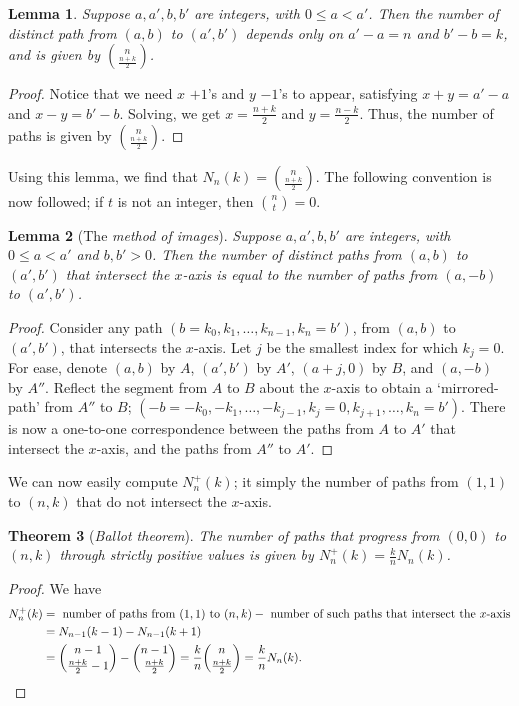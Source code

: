 \documentclass[15pt,a4paper]{book}
\newtheorem{theorem}{Theorem}[chapter]
\newtheorem{lemma}[theorem]{Lemma}
\theoremstyle{definition}
\newcommand{\eax}[1]{\emph{#1}\index{#1}} %
\begin{document}
\begin{lemma}
    Suppose $a,a',b,b'$ are integers, with $0 \leq a < a'$. Then the number of distinct path from $(a,b)$ to $(a',b')$ depends only on $a'-a = n$ and $b'-b = k$, and is given by $\binom{n}{\frac{n+k}{2}}$.
\end{lemma}
\begin{proof}
    Notice that we need $x$ $+1$'s and $y$ $-1$'s to appear, satisfying $x+y = a'-a$ and $x-y = b'-b$. Solving, we get $x = \frac{n+k}{2}$ and $y = \frac{n-k}{2}$. Thus, the number of paths is given by $\binom{n}{\frac{n+k}{2}}$.
\end{proof}
Using this lemma, we find that $N_{n}(k) = \binom{n}{\frac{n+k}{2}}$. The following convention is now followed; if $t$ is not an integer, then $\binom{n}{t} = 0$.

\begin{lemma}[The \eax{method of images}]
    Suppose $a,a',b,b'$ are integers, with $0 \leq a < a'$ and $b,b'>0$. Then the number of distinct paths from $(a,b)$ to $(a',b')$ that intersect the $x$-axis is equal to the number of paths from $(a,-b)$ to $(a',b')$.
\end{lemma}
\begin{proof}
    Consider any path $(b=k_{0},k_{1},\ldots,k_{n-1},k_{n}=b')$, from $(a,b)$ to $(a',b')$, that intersects the $x$-axis. Let $j$ be the smallest index for which $k_{j}=0$. For ease, denote $(a,b)$ by $A$, $(a',b')$ by $A'$, $(a+j,0)$ by $B$, and $(a,-b)$ by $A''$. Reflect the segment from $A$ to $B$ about the $x$-axis to obtain a `mirrored-path' from $A''$ to $B$; $(-b=-k_{0},-k_{1},\ldots,-k_{j-1},k_{j}=0,k_{j+1},\ldots,k_{n}=b')$. There is now a one-to-one correspondence between the paths from $A$ to $A'$ that intersect the $x$-axis, and the paths from $A''$ to $A'$.
\end{proof}
We can now easily compute $N_{n}^{+}(k)$; it simply the number of paths from $(1,1)$ to $(n,k)$ that do not intersect the $x$-axis.
\begin{theorem}[\eax{Ballot theorem}]
    The number of paths that progress from $(0,0)$ to $(n,k)$ through strictly positive values is given by $N_{n}^{+}(k) = \frac{k}{n}N_{n}(k)$.
\end{theorem}
\begin{proof}
    We have
    \begin{align}
        N_{n}^{+}(k) &= \text{ number of paths from $(1,1)$ to $(n,k)$} - \text{ number of such paths that intersect the $x$-axis} \notag \\
        &= N_{n-1}(k-1) - N_{n-1}(k+1) \notag \\
        &= \binom{n-1}{\frac{n+k}{2}-1} - \binom{n-1}{\frac{n+k}{2}} = \frac{k}{n}\binom{n}{\frac{n+k}{2}} = \frac{k}{n}N_{n}(k).
    \end{align}
\end{proof}
\end{document}

